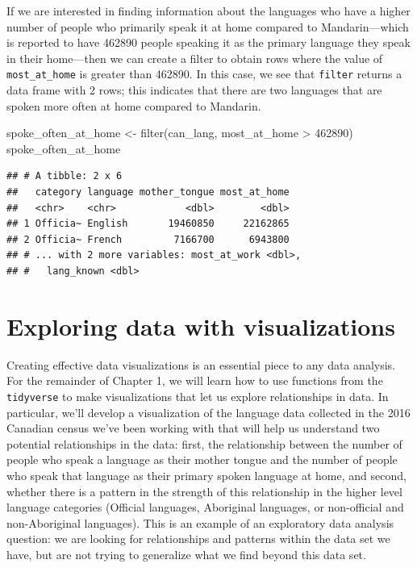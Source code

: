 \documentclass[
]{krantz}
\makeatletter
\newenvironment{Shaded}{\begin{snugshade}}{\end{snugshade}}
\newcommand{\DecValTok}[1]{\textcolor[rgb]{0.06,0.06,0.06}{#1}}
\newcommand{\FunctionTok}[1]{\textcolor[rgb]{0,0,0}{#1}}
\newcommand{\NormalTok}[1]{#1}
\newcommand{\OtherTok}[1]{\textcolor[rgb]{0.37,0.37,0.37}{#1}}
\newcommand{\SpecialCharTok}[1]{\textcolor[rgb]{0,0,0}{#1}}
\newenvironment{kframe}{%
\medskip{}
\setlength{\fboxsep}{.8em}
 \def\at@end@of@kframe{}%
 \ifinner\ifhmode%
  \def\at@end@of@kframe{\end{minipage}}%
  \begin{minipage}{\columnwidth}%
 \fi\fi%
 \def\FrameCommand##1{\hskip\@totalleftmargin \hskip-\fboxsep
 \colorbox{shadecolor}{##1}\hskip-\fboxsep
     \hskip-\linewidth \hskip-\@totalleftmargin \hskip\columnwidth}%
 \MakeFramed {\advance\hsize-\width
   \@totalleftmargin\z@ \linewidth\hsize
   \@setminipage}}%
 {\par\unskip\endMakeFramed%
 \at@end@of@kframe}
\renewenvironment{Shaded}{\begin{kframe}}{\end{kframe}}
\makeatother
\begin{document}
If we are interested in finding information about the languages who have a higher number of people who primarily speak it at home compared to Mandarin---which is reported to have 462890 people speaking it as the primary language they speak in their home---then we can create a filter
to obtain rows where the value of \texttt{most\_at\_home} is greater than 462890.
In this case, we see that \texttt{filter} returns a data frame with 2 rows; this indicates that there are two languages that are spoken more often at
home compared to Mandarin.

\begin{Shaded}
\begin{Highlighting}[]
\NormalTok{spoke\_often\_at\_home }\OtherTok{\textless{}{-}} \FunctionTok{filter}\NormalTok{(can\_lang, most\_at\_home }\SpecialCharTok{\textgreater{}} \DecValTok{462890}\NormalTok{)}
\NormalTok{spoke\_often\_at\_home}
\end{Highlighting}
\end{Shaded}

\begin{verbatim}
## # A tibble: 2 x 6
##   category language mother_tongue most_at_home
##   <chr>    <chr>            <dbl>        <dbl>
## 1 Officia~ English       19460850     22162865
## 2 Officia~ French         7166700      6943800
## # ... with 2 more variables: most_at_work <dbl>,
## #   lang_known <dbl>
\end{verbatim}

\hypertarget{exploring-data-with-visualizations}{%
\section{Exploring data with visualizations}\label{exploring-data-with-visualizations}}

Creating effective data visualizations is an essential piece to any data analysis. For the remainder of Chapter 1, we will learn how to use
functions from the \texttt{tidyverse} to make visualizations that let us explore relationships in data. In particular, we'll develop a visualization
of the language data collected in the 2016 Canadian census we've been working with that will help us understand two potential relationships in the data:
first, the relationship between the number of people who speak a language as their mother tongue and the number of people who speak that language as their primary spoken language at home, and second, whether there is a pattern in the strength of this relationship in the higher level language categories (Official languages, Aboriginal languages, or non-official and non-Aboriginal languages). This is an example of an exploratory data analysis
question: we are looking for relationships and patterns within the data set we have, but are not trying to generalize what we find beyond this data set.
\end{document}
